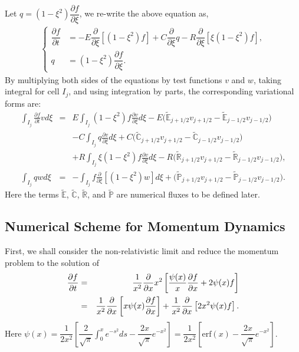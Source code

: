 \documentclass[preprint,11pt]{elsarticle}
\begin{document}
	Let $q=(1-\xi^2)\dfrac{\partial f}{\partial\xi}$, we re-write the above equation as,
	\begin{eqnarray*}
		\begin{cases}
	\dfrac{\partial f}{\partial t} &= -E\dfrac{\partial}{\partial\xi}[(1-\xi^2)f]+C\dfrac{\partial}{\partial\xi}q-R\dfrac{\partial}{\partial\xi}[\xi(1-\xi^2)f],\\
	q &= (1-\xi^2)\dfrac{\partial f}{\partial\xi}. 
		\end{cases}
	\end{eqnarray*}
By multiplying both sides of the equations by test functions $v$ and $w$, taking integral for cell $I_j$, and using integration by parts, the corresponding variational forms are:
	\begin{eqnarray*}
	\int_{I_j}\frac{\partial f}{\partial t}v d\xi&=& E\int_{I_j}(1-\xi^2)f \frac{\partial v}{\partial \xi} d\xi - E\big(\tilde{\mathbb{E}}_{j+1/2}v_{j+1/2}-\tilde{\mathbb{E}}_{j-1/2}v_{j-1/2}\big)\\
	&& - C\int_{I_j} q \frac{\partial v}{\partial\xi} d\xi + C\big(\tilde{\mathbb{C}}_{j+1/2}v_{j+1/2}-\tilde{\mathbb{C}}_{j-1/2}v_{j-1/2}\big)\\
	&& + R\int_{I_j}\xi(1-\xi^2)f \frac{\partial v}{\partial \xi} d\xi - R\big(\tilde{\mathbb{R}}_{j+1/2}v_{j+1/2}-\tilde{\mathbb{R}}_{j-1/2}v_{j-1/2}\big),\\
	\int_{I_j} qw d\xi &=& -\int_{I_j}f\frac{\partial }{\partial\xi}[(1-\xi^2)w] d\xi + \big(\tilde{\mathbb{P}}_{j+1/2}v_{j+1/2}-\tilde{\mathbb{P}}_{j-1/2}v_{j-1/2}\big).
	\end{eqnarray*}
Here the terms $\tilde{\mathbb{E}}$, $\tilde{\mathbb{C}}$, $\tilde{\mathbb{R}}$, and $\tilde{\mathbb{P}}$ are numerical fluxes to be defined later.


\subsection{Numerical Scheme for Momentum Dynamics}
First, we shall consider the non-relativistic limit and reduce the momentum problem to the solution of 
\begin{eqnarray}
\frac{\partial f}{\partial t}&=&\frac{1}{x^2}\frac{\partial}{\partial x}x^2\left[\frac{\psi(x)}{x}\frac{\partial f}{\partial x}+2\psi(x)f\right]\notag\\ 
&=&\frac{1}{x^2}\frac{\partial}{\partial x}\left[ x\psi(x)\frac{\partial f}{\partial x}\right] + \frac{1}{x^2}\frac{\partial}{\partial x}\left[2x^2\psi(x)f \right].
\end{eqnarray}
Here $\psi(x) = \dfrac{1}{2x^2}\left[\dfrac{2}{\sqrt{\pi}}\int_0^{x}e^{-s^2}ds-\dfrac{2x}{\sqrt{\pi}}e^{-x^2}\right]=\dfrac{1}{2x^2}\left[\text{erf}(x)-\dfrac{2x}{\sqrt{\pi}}e^{-x^2}\right].$
\end{document}
